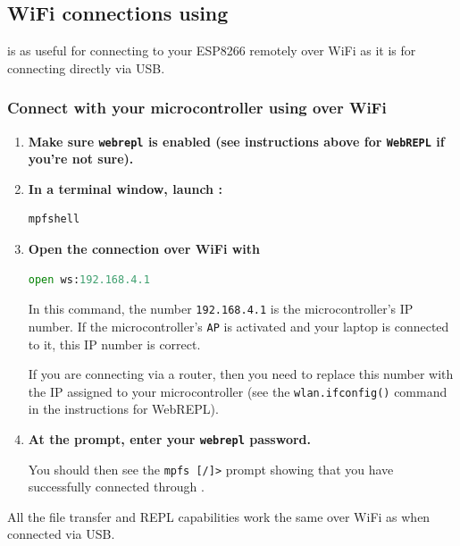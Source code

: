 \subsection{WiFi connections using \mpfshell}
\mpfshell is as useful for connecting to your ESP8266 remotely over WiFi as it is for connecting directly via USB. 

\subsubsection{\howto Connect with your microcontroller using \mpfshell over WiFi}
\begin{enumerate}
	\item \textbf{Make sure \texttt{webrepl} is enabled (see instructions above for \texttt{WebREPL} if you're not sure).}
	\item \textbf{In a terminal window, launch \mpfshell:}
\begin{lstlisting}[language=Python]
mpfshell
\end{lstlisting}
	\item \textbf{Open the connection over WiFi with}	
\begin{lstlisting}[language=Python]
open ws:192.168.4.1
\end{lstlisting}

	In this command, the number \texttt{192.168.4.1} is the microcontroller's IP number. 
	If the microcontroller's \texttt{AP} is activated and your laptop is connected to it, this IP number is correct.
	
	If you are connecting via a router, then you need to replace this number with the IP assigned to your microcontroller (see the \texttt{wlan.ifconfig()} command in the instructions for WebREPL).
	
	\item \textbf{At the prompt, enter your \texttt{webrepl} password.}
	
	You should then see the \verb|mpfs [/]>| prompt showing that you have successfully connected through \mpfshell.
\end{enumerate}

All the \mpfshell file transfer and REPL capabilities work the same over WiFi as when connected via USB.



